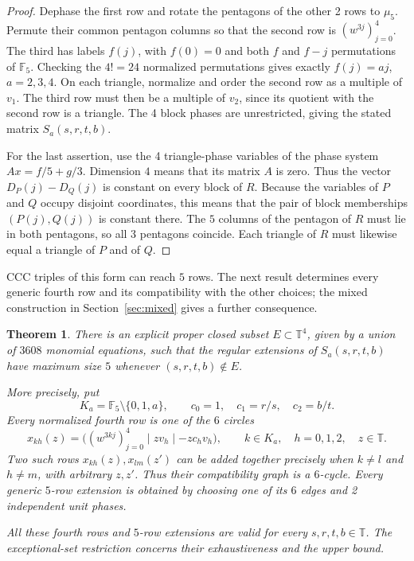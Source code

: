 \documentclass[11pt,a4paper]{article}
\newtheorem{theorem}{Theorem}[section]
\theoremstyle{plain}
\theoremstyle{definition}
\theoremstyle{plain}
\begin{document}
\begin{proof}
Dephase the first row and rotate the pentagons of the other 2 rows to $\mu_5$. Permute their common pentagon columns so that the second row is $(w^{3j})_{j=0}^4$. The third has labels $f(j)$, with $f(0)=0$ and both $f$ and $f-j$ permutations of $\mathbb F_5$. Checking the $4!=24$ normalized permutations gives exactly $f(j)=aj$, $a=2,3,4$. On each triangle, normalize and order the second row as a multiple of $v_1$. The third row must then be a multiple of $v_2$, since its quotient with the second row is a triangle. The 4 block phases are unrestricted, giving the stated matrix $S_a(s,r,t,b)$.

For the last assertion, use the 4 triangle-phase variables of the phase system $Ax=f/5+g/3$. Dimension $4$ means that its matrix $A$ is zero. Thus the vector $D_P(j)-D_Q(j)$ is constant on every block of $R$. Because the variables of $P$ and $Q$ occupy disjoint coordinates, this means that the pair of block memberships $(P(j),Q(j))$ is constant there. The $5$ columns of the pentagon of $R$ must lie in both pentagons, so all 3 pentagons coincide. Each triangle of $R$ must likewise equal a triangle of $P$ and of $Q$.
\end{proof}

$\mathrm{CCC}$ triples of this form can reach $5$ rows. The next result determines every generic fourth row and its compatibility with the other choices; the mixed construction in Section~\ref{sec:mixed} gives a further consequence.

\par\addvspace{\medskipamount}\noindent
\begin{minipage}{\linewidth}
\begin{theorem}\label{ccc_common:extension}
There is an explicit proper closed subset $E\subset\mathbb T^4$, given by a union of $3608$ monomial equations, such that the regular extensions of $S_a(s,r,t,b)$ have maximum size $5$ whenever $(s,r,t,b)\notin E$.

More precisely, put
$$K_a=\mathbb F_5\setminus\{0,1,a\},\qquad c_0=1,\quad c_1=r/s,\quad c_2=b/t.$$
Every normalized fourth row is one of the $6$ circles
\[
x_{kh}(z)=\bigl((w^{3kj})_{j=0}^4\mid z v_h\mid -z c_h v_h\bigr),
\qquad k\in K_a,\quad h=0,1,2,\quad z\in\mathbb T.
\]
Two such rows $x_{kh}(z),x_{lm}(z')$ can be added together precisely when $k\ne l$ and $h\ne m$, with arbitrary $z,z'$. Thus their compatibility graph is a $6$-cycle. Every generic $5$-row extension is obtained by choosing one of its $6$ edges and 2 independent unit phases.

All these fourth rows and $5$-row extensions are valid for every $s,r,t,b\in\mathbb T$. The exceptional-set restriction concerns their exhaustiveness and the upper bound.
\end{theorem}
\end{minipage}
\par\addvspace{\medskipamount}
\end{document}

